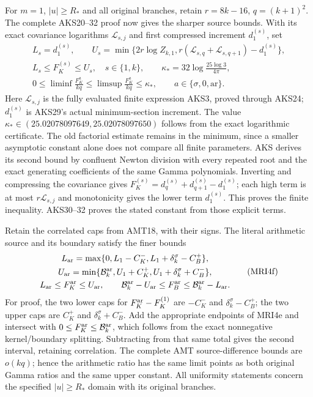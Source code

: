 \documentclass[11pt,a4paper]{article}
\begin{document}
For $m=1$, $|u|\ge R_*$ and all original branches, retain
$r=8k-16$, $q=(k+1)^2$. The complete AKS20--32 proof now gives
the sharper source bounds. With its exact covariance logarithms
$\mathcal L_{s,j}$ and first compressed increment $d_1^{(s)}$, set
\[
 \begin{gathered}
 L_s=d_1^{(s)},\qquad
 U_s=\min\{2r\log Z_{k,1},
       r(\mathcal L_{s,q}+\mathcal L_{s,q+1})-d_1^{(s)}\},\\
 L_s\le F_K^{(s)}\le U_s,\quad s\in\{1,k\},\qquad
 \kappa_*=32\log\frac{25\log3}{4\pi},\\
 0\le\liminf\frac{F_K^a}{kq}
 \le\limsup\frac{F_K^a}{kq}\le\kappa_*,\qquad
 a\in\{\sigma,0,\mathrm{ar}\}.
 \end{gathered}\tag{MRI4e}
\]
Here $\mathcal L_{s,j}$ is the fully evaluated finite expression
AKS3, proved through AKS24; $d_1^{(s)}$ is AKS29's actual minimum-section increment.
The value $\kappa_*\in(25.02078097649,25.02078097650)$ follows
from the exact logarithmic certificate. The old factorial estimate
remains in the minimum, since a smaller asymptotic constant alone
does not compare all finite parameters. AKS derives its second bound
by confluent Newton division with every repeated root and the exact
generating coefficients of the same Gamma polynomials. Inverting and
compressing the covariance gives
$F_K^{(s)}=d_q^{(s)}+d_{q+1}^{(s)}-d_1^{(s)}$;
each high term is at most $r\mathcal L_{s,j}$ and monotonicity gives
the lower term $d_1^{(s)}$. This proves the finite inequality.
AKS30--32 proves the stated constant from those explicit terms.

Retain the correlated caps from AMT18, with their signs. The
literal arithmetic source and its boundary satisfy the finer bounds
\[
 \begin{gathered}
 L_{\rm ar}=\max\{0,L_1-C_K^-,
                       L_1+\delta_k^\sigma-C_B^+\},\\
 U_{\rm ar}=\min\{\mathcal B_k^{\rm ar},
                  U_1+C_K^+,U_1+\delta_k^\sigma+C_B^-\},\\
 L_{\rm ar}\le F_K^{\rm ar}\le U_{\rm ar},\qquad
 \mathcal B_k^{\rm ar}-U_{\rm ar}
       \le F_B^{\rm ar}\le\mathcal B_k^{\rm ar}-L_{\rm ar}.
 \end{gathered}\tag{MRI4f}
\]
For proof, the two lower caps for $F_K^{\rm ar}-F_K^{(1)}$
are $-C_K^-$ and $\delta_k^\sigma-C_B^+$; the two upper caps
are $C_K^+$ and $\delta_k^\sigma+C_B^-$. Add the appropriate
endpoints of MRI4e and intersect with
$0\le F_K^{\rm ar}\le\mathcal B_k^{\rm ar}$, which follows
from the exact nonnegative kernel/boundary splitting. Subtracting
from that same total gives the second interval, retaining correlation.
The complete AMT source-difference bounds are $o(kq)$; hence the
arithmetic ratio has the same limit points as both original Gamma
ratios and the same upper constant. All uniformity statements concern
the specified $|u|\ge R_*$ domain with its original branches.
\end{document}
